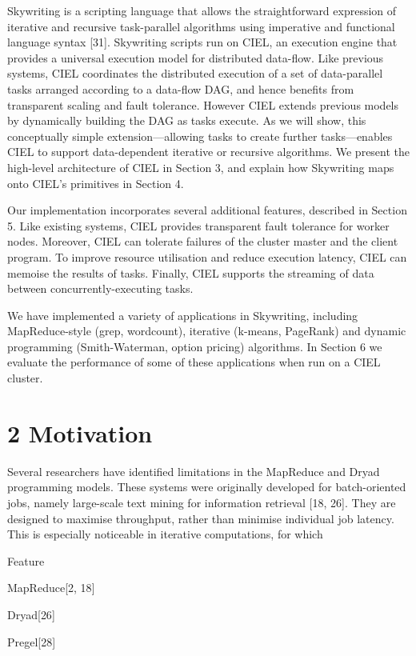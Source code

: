\documentclass[
]{article}
\begin{document}
Skywriting is a scripting language that allows the straightforward
expression of iterative and recursive task-parallel algorithms using
imperative and functional language syntax {[}31{]}. Skywriting scripts
run on CIEL, an execution engine that provides a universal execution
model for distributed data-flow. Like previous systems, CIEL coordinates
the distributed execution of a set of data-parallel tasks arranged
according to a data-flow DAG, and hence benefits from transparent
scaling and fault tolerance. However CIEL extends previous models by
dynamically building the DAG as tasks execute. As we will show, this
conceptually simple extension---allowing tasks to create further
tasks---enables CIEL to support data-dependent iterative or recursive
algorithms. We present the high-level architecture of CIEL in Section 3,
and explain how Skywriting maps onto CIEL's primitives in Section 4.

Our implementation incorporates several additional features, described
in Section 5. Like existing systems, CIEL provides transparent fault
tolerance for worker nodes. Moreover, CIEL can tolerate failures of the
cluster master and the client program. To improve resource utilisation
and reduce execution latency, CIEL can memoise the results of tasks.
Finally, CIEL supports the streaming of data between
concurrently-executing tasks.

We have implemented a variety of applications in Skywriting, including
MapReduce-style (grep, wordcount), iterative (k-means, PageRank) and
dynamic programming (Smith-Waterman, option pricing) algorithms. In
Section 6 we evaluate the performance of some of these applications when
run on a CIEL cluster.

\section{2 Motivation}\label{motivation}

Several researchers have identified limitations in the MapReduce and
Dryad programming models. These systems were originally developed for
batch-oriented jobs, namely large-scale text mining for information
retrieval {[}18, 26{]}. They are designed to maximise throughput, rather
than minimise individual job latency. This is especially noticeable in
iterative computations, for which

Feature

MapReduce{[}2, 18{]}

Dryad{[}26{]}

Pregel{[}28{]}
\end{document}
